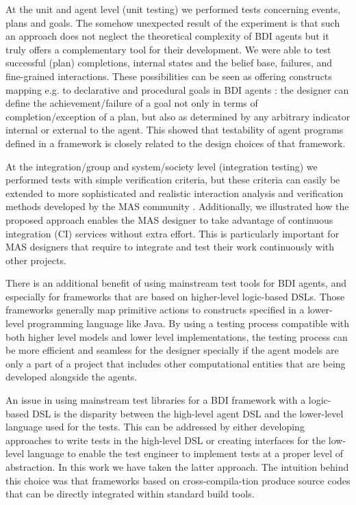 At the unit and agent level (unit testing) we performed tests concerning events, plans and goals. The somehow unexpected result of the experiment is that such an approach does not neglect the theoretical complexity of BDI agents but it truly offers a complementary tool for their development. We were able to test successful (plan) completions, internal states and the belief base, failures, and fine-grained interactions. 
These possibilities can be seen as offering  constructs mapping e.g. to declarative and procedural goals in BDI agents \cite{Winikoff2002}: the designer can define the achievement/failure of a goal not only in terms of completion/exception of a plan, but also as determined by any arbitrary indicator internal or external to the agent. This showed that testability of agent programs defined in a framework is closely related to the design choices of that framework. 

At the integration/group and system/society level (integration testing) we performed tests with simple verification criteria, but these criteria can easily be extended to more sophisticated and realistic interaction analysis and verification methods developed by the MAS community \cite{Botia2006}. Additionally, we illustrated how the proposed approach enables the MAS designer to take advantage of continuous integration (CI) services without extra effort. This is particularly important for MAS designers that require to integrate and test their work continuously with other projects.

There is an additional benefit of using mainstream test tools for BDI agents, and especially for frameworks that are based on higher-level logic-based DSLs. Those frameworks generally map primitive actions to constructs specified in a lower-level programming language like Java. By using a testing process compatible with both higher level models and lower level implementations, the testing process can be more efficient and seamless for the designer specially if the agent models are only a part of a project that includes other computational entities that are being developed alongside the agents. 

An issue in using mainstream test libraries for a BDI framework with a logic-based DSL is the disparity between the high-level agent DSL and the lower-level language used for the tests. This can be addressed by either developing approaches to write tests in the high-level DSL or creating interfaces for the low-level language to enable the test engineer to implement tests at a proper level of abstraction. In this work we have taken the latter approach.
The intuition behind this choice was that frameworks based on cross-compila-tion \cite{Astra,Sarl} produce source codes that can be directly integrated within standard build tools.

